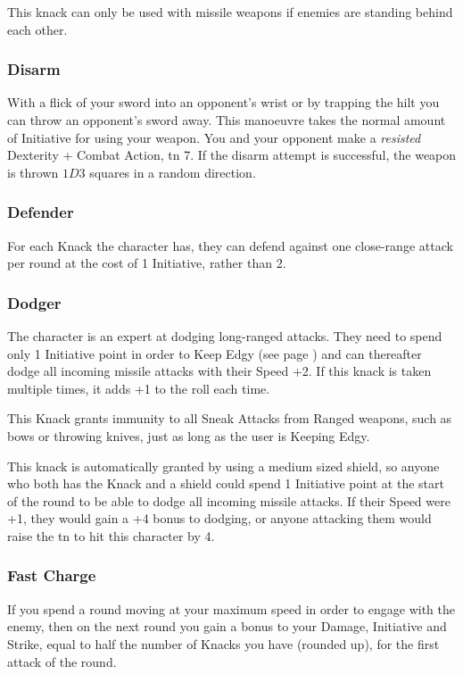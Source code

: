 \begin{multicols}{2}
This knack can only be used with missile weapons if enemies are standing behind each other.

\subsubsection{Disarm}

With a flick of your sword into an opponent's wrist or by trapping the hilt you can throw an opponent's sword away. This manoeuvre takes the normal amount of Initiative for using your weapon. You and your opponent make a \textit{resisted} Dexterity + Combat Action, \gls{tn} 7. If the disarm attempt is successful, the weapon is thrown $1D3$ squares in a random direction.

\subsubsection{Defender}

For each Knack the character has, they can defend against one close-range attack per round at the cost of 1 Initiative, rather than 2.

\subsubsection{Dodger}

The character is an expert at dodging long-ranged attacks. They need to spend only 1 Initiative point in order to Keep Edgy (see page \pageref{edgy}) and can thereafter dodge all incoming missile attacks with their Speed +2. If this knack is taken multiple times, it adds +1 to the roll each time.

This Knack grants immunity to all Sneak Attacks from Ranged weapons, such as bows or throwing knives, just as long as the user is Keeping Edgy.

This knack is automatically granted by using a medium sized shield, so anyone who both has the Knack and a shield could spend 1 Initiative point at the start of the \gls{round} to be able to dodge all incoming missile attacks. If their Speed were +1, they would gain a +4 bonus to dodging, or anyone attacking them would raise the \gls{tn} to hit this character by 4.

\subsubsection{Fast Charge}

If you spend a \gls{round} moving at your maximum speed in order to engage with the enemy, then on the next round you gain a bonus to your Damage, Initiative and Strike, equal to half the number of Knacks you have (rounded up), for the first attack of the round.


\end{multicols}
